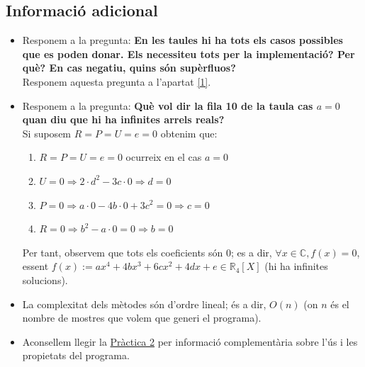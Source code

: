 \documentclass[a4paper, 11pt]{article}
\begin{document}
\subsection{Informació adicional}
\begin{itemize}
   \item Responem a la pregunta: \textbf{ En les taules hi ha tots els casos possibles que es poden donar. Els necessiteu tots per la implementació? Per què? En cas negatiu, quins són supèrfluos?}\\
   Responem aquesta pregunta a l'apartat \textcolor{blue}{\ref{1}}.
   
   \item Responem a la pregunta: \textbf{Què vol dir la fila 10 de la taula cas $a=0$ quan diu que hi ha infinites arrels reals?}\\
   Si suposem $R=P=U=e=0$ obtenim que: 
   \begin{enumerate}
        \item $R=P=U=e=0$ ocurreix en el cas $a=0$ 
        \item $U=0 \Rightarrow 2\cdot d^2-3c\cdot0 \Rightarrow d=0$
        \item $P=0 \Rightarrow a\cdot0-4b\cdot0+3c^2=0 \Rightarrow c=0$
        \item $R=0 \Rightarrow b^2-a\cdot0=0 \Rightarrow b=0$
   \end{enumerate}
   Per tant, observem que tots els coeficients són $0$; es a dir, $\forall x\in\mathbb{C}, f(x) = 0$,\\ essent $f(x):= ax^4+4bx^3+6cx^2+4dx+e\in\mathbb{R}_4[X]$ (hi ha infinites solucions).
   
   \item  La complexitat dels mètodes són d'ordre lineal; és a dir, $O(n)$ (on $n$ és el nombre de mostres que volem que generi el programa).
   
   \item Aconsellem llegir la \textcolor{blue}{\href{https://www.overleaf.com/read/nxmjqvcfdtrt}{Pràctica 2}} per informació complementària sobre l'ús i les propietats del programa.
   
\end{itemize}
\end{document}
